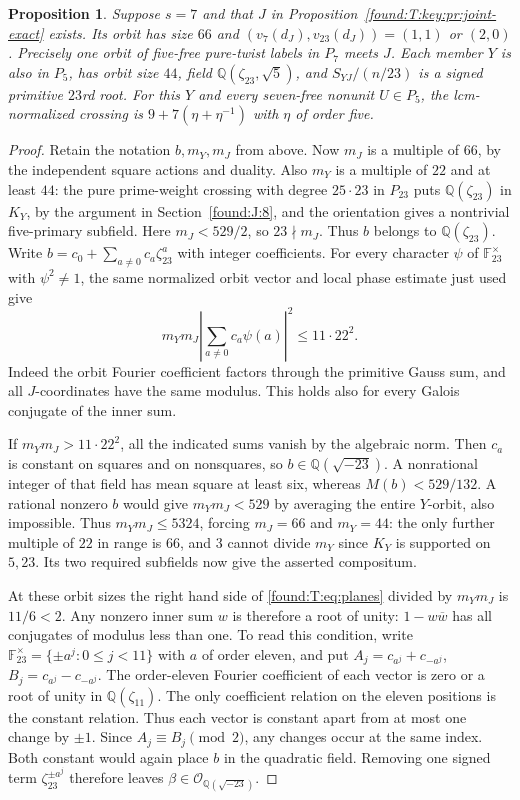 \documentclass[11pt,a4paper]{article}
\numberwithin{equation}{section}
\newtheorem{proposition}[theorem]{Proposition}
\theoremstyle{remark}
\begin{document}
\begin{proposition}\label{found:T:10.3}\label{found:T:key:pr:odd-pinned}
Suppose $s=7$ and that $J$ in Proposition~\ref{found:T:key:pr:joint-exact} exists.
Its orbit has size $66$ and $(v_7(d_J),v_{23}(d_J))=(1,1)$
or $(2,0)$. Precisely one orbit of five-free pure-twist labels
in $P_7$ meets $J$. Each member $Y$ is also in $P_5$, has orbit
size $44$, field $\mathbb Q(\zeta_{23},\sqrt5)$,
and $S_{YJ}/(n/23)$ is a signed primitive $23$rd root. For this
$Y$ and every seven-free nonunit $U\in P_5$, the lcm-normalized
crossing is $9+7(\eta+\eta^{-1})$ with $\eta$ of order five.
\end{proposition}
\begin{proof}
Retain the notation $b,m_Y,m_J$ from above. Now $m_J$ is a multiple
of $66$, by the independent square actions and duality. Also $m_Y$
is a multiple of $22$ and at least $44$: the pure prime-weight
crossing with degree $25\cdot23$ in $P_{23}$ puts
$\mathbb Q(\zeta_{23})$ in $K_Y$, by the argument in Section~\ref{found:J:8},
and the orientation gives a nontrivial five-primary subfield.
Here $m_J<529/2$, so $23\nmid m_J$. Thus $b$ belongs to
$\mathbb Q(\zeta_{23})$. Write $b=c_0+\sum_{a\ne0}c_a\zeta_{23}^a$
with integer coefficients. For every character $\psi$ of
$\mathbb F_{23}^\times$ with $\psi^2\ne1$, the same normalized
orbit vector and local phase estimate just used give
\begin{equation}\label{found:T:eq:planes}
   m_Ym_J\left|\sum_{a\ne0}c_a\psi(a)\right|^2\le11\cdot22^2.
\end{equation}
Indeed the orbit Fourier coefficient factors through the primitive
Gauss sum, and all $J$-coordinates have the same modulus.
This holds also for every Galois conjugate of the inner sum.

If $m_Ym_J>11\cdot22^2$, all the indicated sums vanish by the
algebraic norm. Then $c_a$ is constant on squares and on nonsquares,
so $b\in\mathbb Q(\sqrt{-23})$. A nonrational integer of that
field has mean square at least six, whereas $M(b)<529/132$.
A rational nonzero $b$ would give $m_Ym_J<529$ by averaging
the entire $Y$-orbit, also impossible. Thus $m_Ym_J\le5324$,
forcing $m_J=66$ and $m_Y=44$: the only further multiple of $22$
in range is $66$, and $3$ cannot divide $m_Y$ since $K_Y$ is
supported on $5,23$. Its two required subfields now give the
asserted compositum.

At these orbit sizes the right hand side of \eqref{found:T:eq:planes} divided by
$m_Ym_J$ is $11/6<2$. Any nonzero inner sum $w$ is therefore a root
of unity: $1-w\overline w$ has all conjugates of modulus less than
one. To read this condition, write $\mathbb F_{23}^{\times}=
\{\pm a^j:0\le j<11\}$ with $a$ of order eleven, and put
$A_j=c_{a^j}+c_{-a^j}$, $B_j=c_{a^j}-c_{-a^j}$.
The order-eleven Fourier coefficient of each vector is zero or a
root of unity in $\mathbb Q(\zeta_{11})$. The only coefficient
relation on the eleven positions is the constant relation.
Thus each vector is constant apart from at most one change by
$\pm1$. Since $A_j\equiv B_j\pmod2$, any changes occur at the
same index. Both constant would again place $b$ in the quadratic
field. Removing one signed term $\zeta_{23}^{\pm a^j}$ therefore
leaves $\beta\in\mathcal O_{\mathbb Q(\sqrt{-23})}$.


\end{proof}
\end{document}
